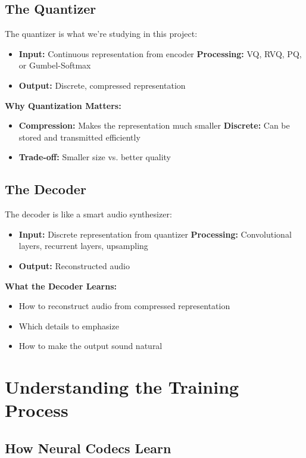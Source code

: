 \documentclass[12pt]{article}
\begin{document}
\subsection{The Quantizer}

The quantizer is what we're studying in this project:
\begin{itemize}
    \item \textbf{Input:} Continuous representation from encoder
    \textbf{Processing:} VQ, RVQ, PQ, or Gumbel-Softmax
    \item \textbf{Output:} Discrete, compressed representation
\end{itemize}

\textbf{Why Quantization Matters:}
\begin{itemize}
    \item \textbf{Compression:} Makes the representation much smaller
    \textbf{Discrete:} Can be stored and transmitted efficiently
    \item \textbf{Trade-off:} Smaller size vs. better quality
\end{itemize}

\subsection{The Decoder}

The decoder is like a smart audio synthesizer:
\begin{itemize}
    \item \textbf{Input:} Discrete representation from quantizer
    \textbf{Processing:} Convolutional layers, recurrent layers, upsampling
    \item \textbf{Output:} Reconstructed audio
\end{itemize}

\textbf{What the Decoder Learns:}
\begin{itemize}
    \item How to reconstruct audio from compressed representation
    \item Which details to emphasize
    \item How to make the output sound natural
\end{itemize}

\section{Understanding the Training Process}

\subsection{How Neural Codecs Learn}
\end{document}
